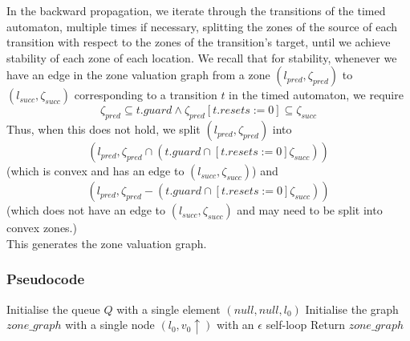 \documentclass{article}
\begin{document}
In the backward propagation, we
iterate through the transitions of the timed automaton, multiple times
if necessary, splitting the zones of the source of each transition
with respect to the zones of the transition's target, until we achieve
stability of each zone of each location. We recall that for stability,
whenever we have an edge in the zone valuation graph from a zone
$(l_{pred}, \zeta _{pred})$ to $(l_{succ}, \zeta _{succ})$
corresponding to a transition $t$ in the timed automaton, we require 
\begin{displaymath} 
  \zeta _{pred} \subseteq t.guard
  \wedge
  \zeta _{pred} [t.resets := 0] \subseteq \zeta _{succ}
\end{displaymath} 
Thus, when this does not hold, we split $(l_{pred}, \zeta _{pred})$
into
\begin{displaymath} 
  (l_{pred}, \zeta _{pred} \cap (t.guard \cap [t.resets := 0] \zeta _{succ}))
\end{displaymath} 
(which is convex and has an edge to $(l_{succ}, \zeta _{succ})$)
and
\begin{displaymath} 
  (l_{pred}, \zeta _{pred} - (t.guard \cap [t.resets := 0] \zeta _{succ}))
\end{displaymath} 
(which does not have an edge to $(l_{succ}, \zeta _{succ})$ and may
need to be split into convex zones.) \\
This generates the zone valuation graph.

\subsubsection{Pseudocode}

\begin{algorithm2e}[H]
  Initialise the queue $Q$ with a single element $(null, null, l_0)$\;
  Initialise the graph $zone\_graph$ with a single node $(l_0, v_0 \uparrow)$
  with an $\epsilon$ self-loop\;
  Return $zone\_graph$\;
\end{algorithm2e}
\end{document}
